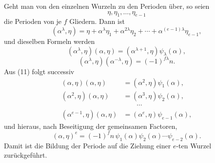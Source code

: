 \documentclass[11pt]{article}
\begin{document}
Geht man von den einzelnen Wurzeln zu den Perioden über, so seien
\[
        \eta,\eta_1,\ldots,\eta_{e-1}
\]
die Perioden von je $f$ Gliedern. Dann ist
\[
        (\alpha^\lambda,\eta)=
        \eta+\alpha^\lambda\eta_1+
        \alpha^{2\lambda}\eta_2+
        \cdots+
        \alpha^{(e-1)\lambda}\eta_{e-1},                                      \tag{10}
\]
und dieselben Formeln werden
\[
        (\alpha^\lambda,
\eta)(\alpha,
\eta)=
        (\alpha^{\lambda+1},
\eta)\psi_\lambda(\alpha),                         \tag{11}
\]
\[
        (\alpha^\lambda,
\eta)(\alpha^{-\lambda},
\eta)=(-1)^{f\lambda}n.                         \tag{12}
\]
Aus (11) folgt successiv
\[
\begin{aligned}
(\alpha,
\eta)(\alpha,
\eta)&=(\alpha^2,
\eta)\psi_1(\alpha),\\
(\alpha^2,
\eta)(\alpha,
\eta)&=(\alpha^3,
\eta)\psi_2(\alpha),\\
&\hspace{2em}\cdots\\
(\alpha^{e-1},
\eta)(\alpha,
\eta)&=(\alpha^e,
\eta)\psi_{e-1}(\alpha),
\end{aligned}
\]
und hieraus, nach Beseitigung der gemeinsamen Factoren,
\[
        (\alpha,
\eta)^e=(-1)^f n\,\psi_1(\alpha)
        \psi_2(\alpha)\cdots\psi_{e-2}(\alpha).                         \tag{13}
\]
Damit ist die Bildung der Periode auf die Ziehung einer $e$-ten Wurzel zurückgeführt.
\end{document}
